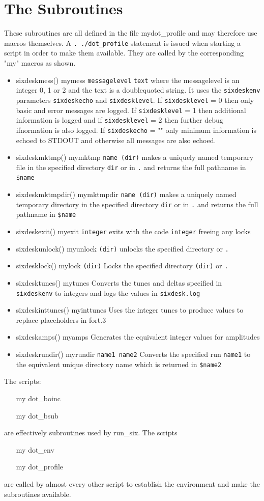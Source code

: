 \documentclass{cernatsnote}    %
\begin{document}
\section{The Subroutines}
These subroutines are all defined in the file mydot\_profile
and may therefore use macros themselves. A {\tt . ./dot\_profile}
statement is issued when starting a script in order to make
them available.
They are called by the corresponding "my" macros as shown.
\begin{itemize}
\item sixdeskmess() mymess {\tt messagelevel} {\tt text}
where the messagelevel is an integer 0, 1 or 2 and the text is 
a doublequoted string. It uses the {\tt sixdeskenv} parameters 
{\tt sixdeskecho} and {\tt sixdesklevel}. 
If {\tt sixdesklevel} =  0 then only basic and error messages are logged.
If {\tt sixdesklevel} = 1 then additional information is logged and if
{\tt sixdesklevel} = 2 then further debug ifnormation is also logged.
If {\tt sixdeskecho}  = "" only minimum information is echoed to STDOUT
and otherwise all messages are also echoed.
\item sixdeskmktmp() mymktmp {\tt name (dir)} makes a uniquely named temporary file in the 
specified directory {\tt dir} or in {\tt .} and returns the full pathname in {\tt \$name} 
\item sixdeskmktmpdir() mymktmpdir {\tt name (dir)} makes a uniquely named temporary directory
in the specified directory {\tt dir} or in {\tt .} and returns the full pathname in {\tt \$name}
\item sixdeskexit() myexit {\tt integer} exits with the code {\tt integer} freeing any locks
\item sixdeskunlock() myunlock {\tt (dir)} unlocks the specified directory or {\tt .}
\item sixdesklock() mylock {\tt (dir)} Locks the specified directory {\tt (dir)} or {\tt .}
\item sixdesktunes() mytunes Converts the tunes and deltas specified in {\tt sixdeskenv}
to integers and logs the values in {\tt sixdesk.log} 
\item sixdeskinttunes() myinttunes Uses the integer tunes to produce values to replace 
placeholders in fort.3
\item sixdeskamps() myamps Generates the equivalent integer values for amplitudes
\item sixdeskrundir() myrundir {\tt name1 name2} Converts the specified run {\tt name1}
to the equivalent unique directory name which is returned in {\tt \$name2} 
\end{itemize}
The scripts:
\begin{itemize}
\item [my]dot\_boinc
\item [my]dot\_bsub
\end{itemize}
are effectively subroutines used by run\_six. 
The scripts 
\begin{itemize}
\item [my]dot\_env
\item [my]dot\_profile
\end{itemize} 
are called by almost every other script to establish the environment
and make the subroutines available.
\end{document}
